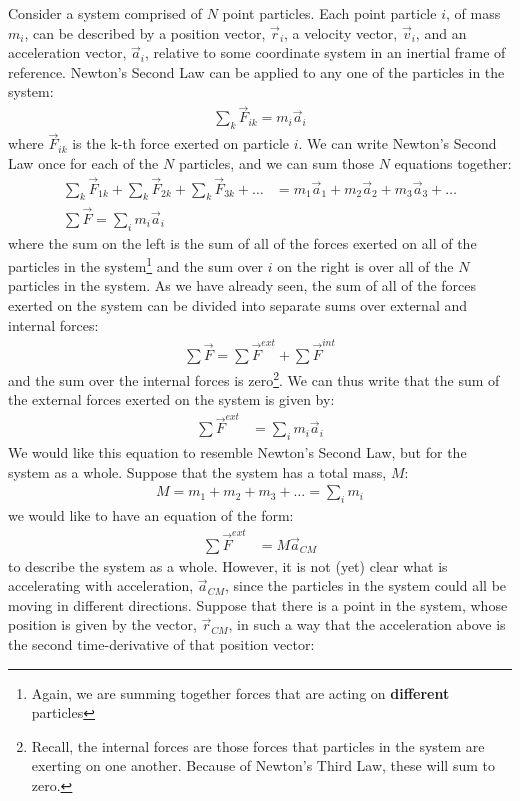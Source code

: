 Consider a system comprised of $N$ point particles. Each point particle $i$, of mass $m_i$, can be described by a position vector, $\vec r_i$, a velocity vector, $\vec v_i$, and an acceleration vector, $\vec a_i$, relative to some coordinate system in an inertial frame of reference. Newton's Second Law can be applied to any one of the particles in the system:
\begin{align*}
\sum_k \vec F_{ik} = m_i \vec a_i
\end{align*}
where $\vec F_{ik}$ is the k-th force exerted on particle $i$. We can write Newton's Second Law once for each of the $N$ particles, and we can sum those $N$ equations together:
\begin{align*}
\sum_k \vec F_{1k} + \sum_k \vec F_{2k} + \sum_k \vec F_{3k} +\dots &= m_1\vec a_1 + m_2 \vec a_2 + m_3 \vec a_3 + \dots\\
\sum \vec F = \sum_i m_i \vec a_i 
\end{align*}
where the sum on the left is the sum of all of the forces exerted on all of the particles in the system\footnote{Again, we are summing together forces that are acting on \textbf{different} particles} and the sum over $i$ on the right is over all of the $N$ particles in the system. As we have already seen, the sum of all of the forces exerted on the system can be divided into separate sums over external and internal forces:
\begin{align*}
\sum \vec F = \sum \vec F^{ext} + \sum \vec F^{int} 
\end{align*}
and the sum over the internal forces is zero\footnote{Recall, the internal forces are those forces that particles in the system are exerting on one another. Because of Newton's Third Law, these will sum to zero.}. We can thus write that the sum of the external forces exerted on the system is given by:
\begin{align}
\label{eqn:momentumandcm:cmtemp1}
\sum \vec F^{ext}&= \sum_i m_i \vec a_i
\end{align}
We would like this equation to resemble Newton's Second Law, but for the system as a whole. Suppose that the system has a total mass, $M$:
\begin{align*}
M = m_1 + m_2 + m_3 +\dots = \sum_i m_i
\end{align*}
we would like to have an equation of the form:
\begin{align}
\label{eqn:momentumandcm:cmtemp2}
\sum \vec F^{ext}&=M\vec a_{CM}
\end{align}
to describe the system as a whole. However, it is not (yet) clear what is accelerating with acceleration, $\vec a_{CM}$, since the particles in the system could all be moving in different directions. Suppose that there is a point in the system, whose position is given by the vector, $\vec r_{CM}$, in such a way that the acceleration above is the second time-derivative of that position vector:
